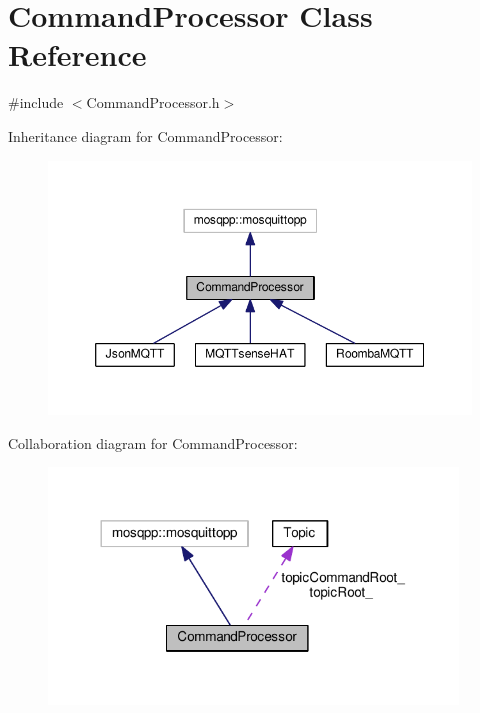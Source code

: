 \hypertarget{class_command_processor}{}\section{Command\+Processor Class Reference}
\label{class_command_processor}


{\ttfamily \#include $<$Command\+Processor.\+h$>$}



Inheritance diagram for Command\+Processor\+:\nopagebreak
\begin{figure}[H]
\begin{center}
\leavevmode
\includegraphics[width=350pt]{class_command_processor__inherit__graph}
\end{center}
\end{figure}


Collaboration diagram for Command\+Processor\+:\nopagebreak
\begin{figure}[H]
\begin{center}
\leavevmode
\includegraphics[width=308pt]{class_command_processor__coll__graph}
\end{center}
\end{figure}
